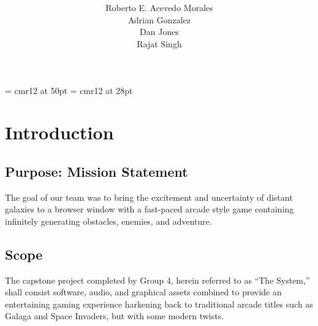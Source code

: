 \documentclass[12pt]{report}
\begin{document}


\font\titlefont = cmr12 at 50pt
\font\subtitlefont = cmr12 at 28pt
\title{ \\ \vspace{10pt} }
\author{Roberto E. Acevedo Morales \\ Adrian Gonzalez \\ Dan Jones \\ Rajat Singh}
\date{}
\maketitle

\tableofcontents \newpage

\section{Introduction}
	\subsection{Purpose: Mission Statement}
		The goal of our team was to bring the excitement and uncertainty of distant galaxies to a browser window with a fast-paced arcade style game containing infinitely generating obstacles, enemies, and adventure.
	\subsection{Scope}
		The capstone project completed by Group 4, herein referred to as ``The System,'' shall consist software, audio, and graphical assets combined to provide an entertaining gaming experience harkening back to traditional arcade titles such as Galaga and Space Invaders, but with some modern twists.
\end{document}
